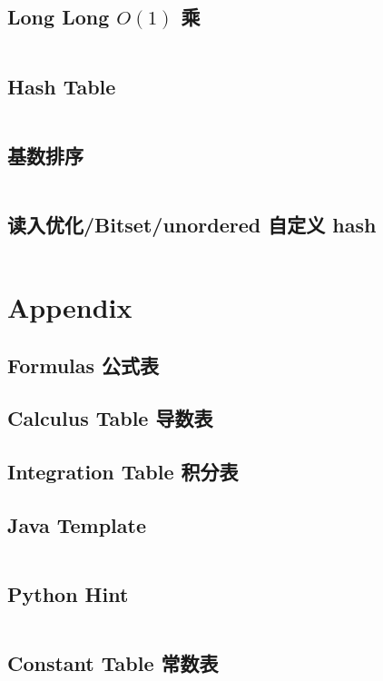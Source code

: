 \documentclass[titlepage, a4paper]{article}
\begin{document}
\begin{multicols}{2}
\begin{spacing}{0.6}
				\subsection{Long Long $O(1)$ 乘 \checkmark}
				\inputminted{cpp}{src/Miscellany/LLFPM.cpp}
				\subsection{Hash Table}
				\inputminted{cpp}{src/DataStructure/hashmap.cpp}
				\subsection{基数排序}
				\inputminted{cpp}{src/Miscellany/RadixSort.cpp}
				\subsection{读入优化/Bitset/unordered 自定义 hash}
				\inputminted{cpp}{src/Miscellany/hack.cpp}
			
			\section{Appendix}
				\begin{spacing}{0.5}
				\subsection{Formulas 公式表}
				
				\subsection{Calculus Table 导数表}
				
				\subsection{Integration Table 积分表}
				
				\subsection{Java Template}
				\inputminted{java}{src/Miscellany/Main.java}
				\subsection{Python Hint}
				\inputminted{python}{src/Miscellany/py.py}
				\subsection{Constant Table 常数表}
				
				\end{spacing}

\end{spacing}
\end{multicols}
\end{document}
